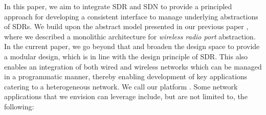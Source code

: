 In this paper, we aim to integrate SDR and SDN to provide a principled approach for developing a consistent interface to manage underlying abstractions of SDRs. We build upon the abstract model presented in our previous paper \cite{crossflow}, where we described a monolithic architecture for \emph{wireless radio port} abstraction. In the current paper, we go beyond that and broaden the design space to provide a modular design, which is in line with the design principle of SDR.
This also enables an integration of both wired and wireless networks which can be managed in a programmatic manner, thereby enabling development of key applications catering to a heterogeneous network. We call our platform \crossflow. Some network applications that we envision can leverage \crossflow include, but are not limited to, the following:
